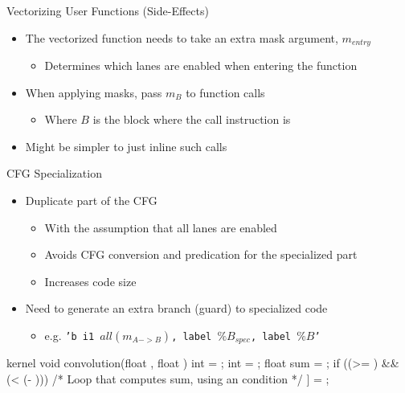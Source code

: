 \begin{frame}{Vectorizing User Functions (Side-Effects)}

\begin{itemize}
    \item The vectorized function needs to take an extra mask argument, $m_{entry}$
    \begin{itemize}
        \item Determines which lanes are enabled when entering the function
    \end{itemize}
    \item When applying masks, pass $m_{B}$ to function calls
    \begin{itemize}
        \item Where $B$ is the block where the call instruction is
    \end{itemize}
    \item Might be simpler to just inline such calls
\end{itemize}

\end{frame}


\begin{frame}[fragile]{CFG Specialization}

\begin{itemize}
    \item Duplicate part of the CFG
    \begin{itemize}
        \item With the assumption that all lanes are enabled
        \item Avoids CFG conversion and predication for the specialized part
        \item Increases code size
    \end{itemize}
    \item Need to generate an extra branch (guard) to specialized code
    \begin{itemize}
        \item e.g. \texttt{'b i1 $all(m_{A->B})$, label $\%B_{spec}$, label $\%B$'}
    \end{itemize}
\end{itemize}

\begin{codebox}[commandchars=\\\[\]]
kernel void convolution(float \uniform[*src], float \uniform[*dst]) {
  int \varying[x] = ;
  int \uniform[width] = ;
  float sum = \uniform[0.0f];
  if ((\varying[x] >= ) && (\varying[x] < (\uniform[width] - ))) {
    /* Loop that computes sum, using an \uniform[uniform] condition */
  }
  \uniform[dst]\idx[\varying[x]] = \varying[sum];
}
\end{codebox}

\end{frame}

